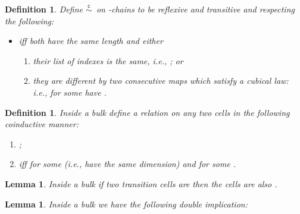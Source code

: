 \documentclass[submission,copyright,creativecommons]{eptcs}
\newtheorem{lemma}[theorem]{Lemma}
\newtheorem{definition}[theorem]{Definition}
\newcommand{\cp}[1]{}
\newcommand\chainEquivHDAsculpture{\ensuremath{\overset{\mathsf{c}}{\sim}}}
\begin{document}
\begin{definition}
Define \chainEquivHDAsculpture\ on -chains to be reflexive and transitive and respecting the following:
\begin{itemize}
\item[]  iff both have the same length and either
\begin{enumerate}
\item their list of indexes is the same, i.e., ; or


\item they are different by two consecutive maps which satisfy a cubical law: i.e., for some  have .
\end{enumerate}
\end{itemize}
\end{definition}

\begin{definition}
Inside a bulk  define a relation on any two cells  in the following coinductive manner:
\begin{enumerate}
\item ;

\item  iff  for some  (i.e., have the same dimension) and  for some .
\end{enumerate}
\end{definition}

\begin{lemma}
Inside a bulk  if two transition cells are  then the cells are also .
\end{lemma}

\cp{Give Proof!!}


\begin{lemma}\label{lemma_chains_equiv}
Inside a bulk  we have the following double implication:

\end{lemma}
\end{document}
